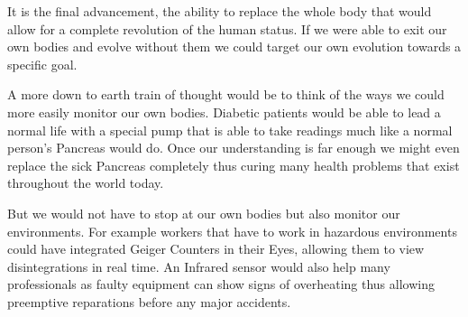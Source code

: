 \documentclass[
      12pt,
      a4paper,
      cleardoublepage=empty,
      final,
      twoside
        ]{scrbook}
\begin{document}
      \begin{par}
        It is the final advancement, the ability to replace the whole body that would allow for a complete revolution of the human status. 
        If we were able to exit our own bodies and evolve without them we could target our own evolution towards a specific goal.\cite{NBICReport} 
      \end{par}
      \begin{par}
        A more down to earth train of thought would be to think of the ways we could more easily monitor our own bodies. 
        Diabetic patients would be able to lead a normal life with a special pump that is able to take readings much like a normal person's Pancreas would do. 
        Once our understanding is far enough we might even replace the sick Pancreas completely thus curing many health problems that exist throughout the world today.
      \end{par}
      \begin{par}
        But we would not have to stop at our own bodies but also monitor our environments. 
        For example workers that have to work in hazardous environments could have integrated Geiger Counters in their Eyes, allowing them to view disintegrations in real time. 
        An Infrared sensor would also help many professionals as faulty equipment can show signs of overheating thus allowing preemptive reparations before any major accidents.
      \end{par}
\end{document}
